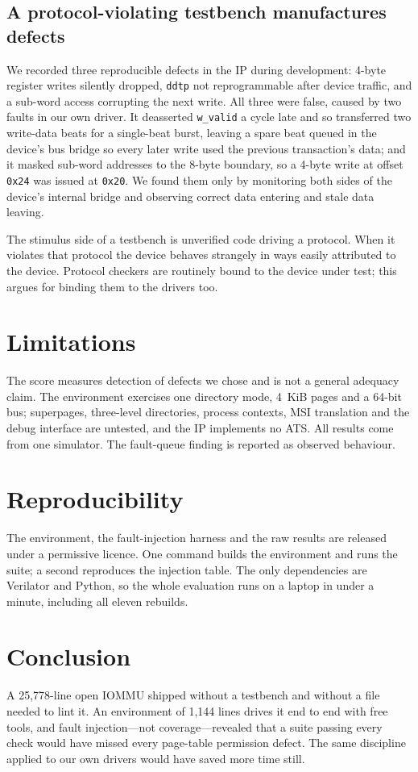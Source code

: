 \documentclass[conference]{IEEEtran}
\begin{document}
\subsection{A protocol-violating testbench manufactures defects}
\label{sec:false}
We recorded three reproducible defects in the IP during development: 4-byte
register writes silently dropped, \texttt{ddtp} not reprogrammable after device
traffic, and a sub-word access corrupting the next write. All three were false,
caused by two faults in our own driver. It deasserted \texttt{w\_valid} a cycle
late and so transferred two write-data beats for a single-beat burst, leaving a
spare beat queued in the device's bus bridge so every later write used the
previous transaction's data; and it masked sub-word addresses to the 8-byte
boundary, so a 4-byte write at offset \texttt{0x24} was issued at \texttt{0x20}.
We found them only by monitoring both sides of the device's internal bridge and
observing correct data entering and stale data leaving.

The stimulus side of a testbench is unverified code driving a protocol. When it
violates that protocol the device behaves strangely in ways easily attributed to
the device. Protocol checkers are routinely bound to the device under test; this
argues for binding them to the drivers too.

\section{Limitations}
The score measures detection of defects we chose and is not a general adequacy
claim. The environment exercises one directory mode, 4~KiB pages and a 64-bit
bus; superpages, three-level directories, process contexts, MSI translation and
the debug interface are untested, and the IP implements no ATS. All results come
from one simulator. The fault-queue finding is reported as observed behaviour.

\section{Reproducibility}
The environment, the fault-injection harness and the raw results are released
under a permissive licence. One command builds the environment and runs the
suite; a second reproduces the injection table. The only dependencies are
Verilator and Python, so the whole evaluation runs on a laptop in under a
minute, including all eleven rebuilds.

\section{Conclusion}
A 25{,}778-line open IOMMU shipped without a testbench and without a file needed
to lint it. An environment of 1{,}144 lines drives it end to end with free
tools, and fault injection---not coverage---revealed that a suite passing every
check would have missed every page-table permission defect. The same discipline
applied to our own drivers would have saved more time still.
\end{document}
